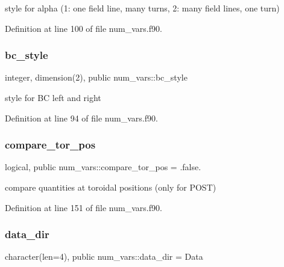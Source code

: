 style for alpha (1\+: one field line, many turns, 2\+: many field lines, one turn) 



Definition at line 100 of file num\+\_\+vars.\+f90.

\mbox{\label{namespacenum__vars_aabda06d22d0bad62383df3a0d977a82c}} 
\subsubsection{\texorpdfstring{bc\+\_\+style}{bc\_style}}
{\footnotesize\ttfamily integer, dimension(2), public num\+\_\+vars\+::bc\+\_\+style}



style for BC left and right 



Definition at line 94 of file num\+\_\+vars.\+f90.

\mbox{\label{namespacenum__vars_a2f303733b113f96fad56bb8ceb337c85}} 
\subsubsection{\texorpdfstring{compare\+\_\+tor\+\_\+pos}{compare\_tor\_pos}}
{\footnotesize\ttfamily logical, public num\+\_\+vars\+::compare\+\_\+tor\+\_\+pos = .false.}



compare quantities at toroidal positions (only for P\+O\+ST) 



Definition at line 151 of file num\+\_\+vars.\+f90.

\mbox{\label{namespacenum__vars_af48173a7062997585f7a7ca9363290b3}} 
\subsubsection{\texorpdfstring{data\+\_\+dir}{data\_dir}}
{\footnotesize\ttfamily character(len=4), public num\+\_\+vars\+::data\+\_\+dir = \textquotesingle{}Data\textquotesingle{}}



